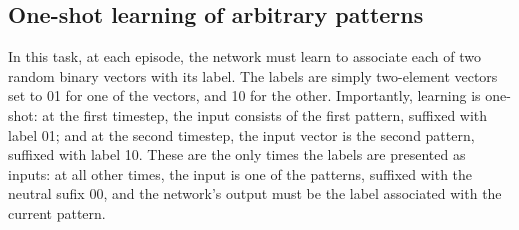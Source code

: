 \documentclass{article}
\begin{document}
\subsection{One-shot learning of arbitrary patterns}



In this task, at each episode, the network must learn to associate each of two
random binary vectors with its label. The labels are simply two-element vectors
set to 01 for one of the
vectors, and 10 for the other. Importantly, learning is one-shot: at the first
timestep, the input consists of the first pattern, suffixed with label 01;
and at the second timestep, the input vector is the second pattern, suffixed
with label 10. These are the only times the labels are presented as inputs: at
all other times, the input is one of the patterns, suffixed with the neutral
sufix 00, and the network's output must be the label associated with the current
pattern.
\end{document}
